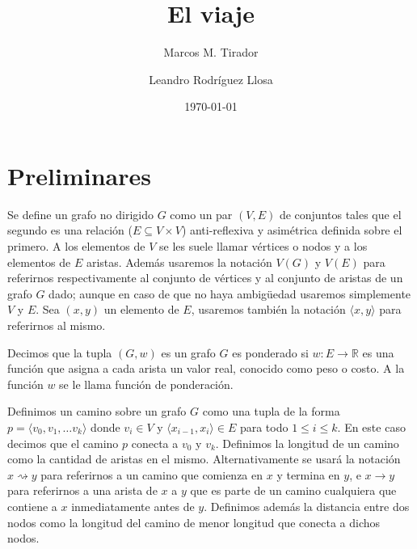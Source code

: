 \documentclass[10pt]{amsart}
\theoremstyle{definition}
\numberwithin{equation}{section}
\newcommand{\rr}{\mathbb{R}}
\begin{document}
	
	\mbox{}
	\title{El viaje}
	
	\author{Marcos M. Tirador}
	\address{Facultad de Matem\'atica y Computaci\'on \\ Universidad de La Habana \\ Ciudad de La Habana \\ Cuba}
	
	
	\author{Leandro Rodr\'iguez Llosa}
	\address{Facultad de Matem\'atica y Computaci\'on \\ Universidad de La Habana \\ Ciudad de La Habana \\ Cuba}
		

\date{\today}


\bigskip
\maketitle


\bigskip
\section{Preliminares}
Se define un grafo no dirigido $G$ como un par $(V,E)$ de conjuntos tales que el segundo es una relaci\'on ($E\subseteq V \times V$) anti-reflexiva y asim\'etrica definida sobre el primero. A los elementos de $V$ se les suele llamar v\'ertices o nodos y a los elementos de $E$ aristas. Adem\'as usaremos la notaci\'on $V(G)$ y $V(E)$ para referirnos respectivamente al conjunto de v\'ertices y al conjunto de aristas  de un grafo $G$ dado; aunque en caso de que no haya ambig\"uedad usaremos simplemente $V$ y $E$. Sea $(x,y)$ un elemento de $E$, usaremos tambi\'en la notaci\'on $\langle x,y \rangle$ para referirnos al mismo.

Decimos que la tupla $(G,w)$ es un grafo $G$ es ponderado si $w\colon E \rightarrow \rr$ es una funci\'on que asigna a cada arista un valor real, conocido como peso o costo. A la funci\'on $w$ se le llama funci\'on de ponderaci\'on. 

Definimos un camino sobre un grafo $G$ como una tupla de la forma $p = \langle v_0,v_1, \dots v_k \rangle$ donde $v_i \in V$ y $\langle x_{i-1},x_i \rangle \in E$ para todo $1\leq i \leq k$. En este caso decimos que el camino $p$ conecta a $v_0$ y $v_k$. Definimos la longitud de un camino como la cantidad de aristas en el mismo. Alternativamente se usar\'a la notaci\'on $x \rightsquigarrow y$ para referirnos a un camino que comienza en $x$ y termina en $y$, e $x \rightarrow y$ para referirnos a una arista de $x$ a $y$ que es parte de un camino cualquiera que contiene a $x$ inmediatamente antes de $y$. Definimos adem\'as la distancia entre dos nodos como la longitud del camino de menor longitud que conecta a dichos nodos.
\end{document}
